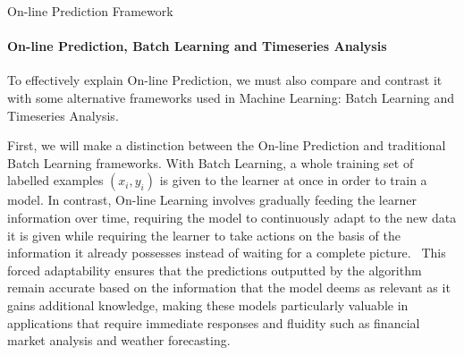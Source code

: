 \begin{protocol}[H]
    \caption{On-line Prediction Framework}\label{on-line_prediction_framework}
    \begin{algorithmic}[1]
    \end{algorithmic}
\end{protocol}

\paragraph{On-line Prediction, Batch Learning and Timeseries Analysis}
To effectively explain On-line Prediction, we must also compare and contrast it with some alternative frameworks used in Machine Learning: Batch Learning and Timeseries Analysis.

First, we will make a distinction between the On-line Prediction and traditional Batch Learning frameworks. With Batch Learning, a whole training set of labelled examples $(x_i, y_i)$ is given to the learner at once in order to train a model. In contrast, On-line Learning involves gradually feeding the learner information over time, requiring the model to continuously adapt to the new data it is given while requiring the learner to take actions on the basis of the information it already possesses instead of waiting for a complete picture.~\cite{kalnishkan:2015} This forced adaptability ensures that the predictions outputted by the algorithm remain accurate based on the information that the model deems as relevant as it gains additional knowledge, making these models particularly valuable in applications that require immediate responses and fluidity such as financial market analysis and weather forecasting.

